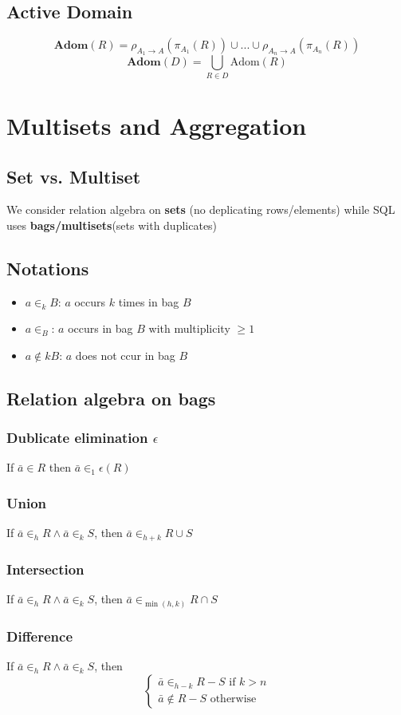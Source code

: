 \documentclass{article}
\begin{document}
\subsection{Active Domain}
$$\textbf{Adom}(R) = \rho_{A_1\rightarrow A}(\pi_{A_1}(R))\cup ... \cup \rho_{A_n\rightarrow A}(\pi_{A_n}(R))$$
$$\textbf{Adom}(D) = \bigcup_{R\in D}\text{Adom}(R)$$


\section{Multisets and Aggregation}
\subsection{Set vs. Multiset}
We consider relation algebra on \textbf{sets} (no deplicating rows/elements) while SQL uses \textbf{bags/multisets}(sets with duplicates)

\subsection{Notations}
\begin{itemize}
  \item $a \in_k B$: $a$ occurs $k$ times in bag $B$
  \item $a \in_ B$: $a$ occurs in bag $B$ with multiplicity $\geq 1$
  \item $a \notin k B$: $a$ does not ccur in bag $B$
\end{itemize}

\subsection{Relation algebra on bags}
\subsubsection*{Dublicate elimination $\epsilon$}
If $\bar{a} \in R$ then $\bar{a}\in_1\epsilon(R)$
\subsubsection*{Union}
If $\bar{a} \in_h R \wedge \bar{a}\in_k S$, then $\bar{a} \in_{h+k} R\cup S$
\subsubsection*{Intersection}
If $\bar{a} \in_h R \wedge \bar{a}\in_k S$, then $\bar{a} \in_{\min(h,k)} R\cap S$
\subsubsection*{Difference}
If $\bar{a} \in_h R \wedge \bar{a}\in_k S$, then
$$\begin{cases}
    \bar{a} \in_{h-k} R-S \text{ if } k > n \\
    \bar{a} \notin R-S\text{ otherwise}
  \end{cases}$$
\end{document}
